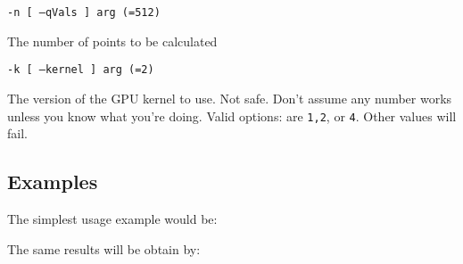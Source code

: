 \documentclass[../D+Manual.tex]{subfiles}
\begin{document}
\texttt{-n [ --qVals ] arg (=512)}

The number of points to be calculated

\texttt{-k [ --kernel ] arg (=2)}

The version of the GPU kernel to use. Not
safe. Don't assume any number works unless
you know what you're doing. Valid options:
are \texttt{1,2}, or \texttt{4}. Other values will fail.

\subsection{Examples}

The simplest usage example would be:


\noindent The same results will be obtain by: 



\printbibliography[heading=subbibliography]
\end{document}
